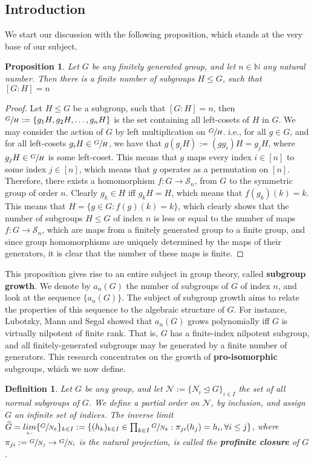\documentclass[12pt]{article}
\newtheorem{proposition}[theorem]{Proposition}
\newtheorem{definition}[theorem]{Definition}
\begin{document}
\subsection{Introduction}
We start our discussion with the following proposition, which stands at the very base of our subject.
\begin{proposition} \label{prop:finite.number.subgroups}
Let $G$ be any finitely generated group, and let $n\in\mathbb{N}$ any natural number. Then there is a finite number of subgroups $H\leq G$, such that $[G:H]=n$
\end{proposition}
\begin{proof}
Let $H\leq G$ be a subgroup, such that $[G:H]=n$, then $\sfrac{G}{H}:=\{g_1H,g_2H,\dots,g_nH\}$ is the set containing all left-cosets of $H$ in $G$. We may consider the action of $G$ by left multiplication on $\sfrac{G}{H}$. i.e., for all $g\in G$, and for all left-cosets $g_iH\in\sfrac{G}{H}$, we have that $g(g_iH):=(gg_i)H=g_jH$, where $g_jH\in\sfrac{G}{H}$ is some left-coset. This means that $g$ maps every index $i\in[n]$ to some index $j\in[n]$, which means that $g$ operates as a permutation on $[n]$. Therefore, there exists a homomorphism $f:G\rightarrow\mathcal{S}_n$, from $G$ to the symmetric group of order $n$. 
Clearly $g_k\in H$ iff $g_kH=H$, which means that $f(g_k)(k)=k$.  This means that $H=\{g\in G : f(g)(k)=k\}$, which clearly shows that the number of subgroups $H\leq G$ of index $n$ is less or equal to the number of maps $f : G
\rightarrow\mathcal{S}_n$, which are maps from a finitely generated group to a finite group, and since group homomorphisms are uniquely determined by the maps of their generators, it is clear that the number of these maps is finite.
\end{proof}
This proposition gives rise to an entire subject in group theory, called \textbf{subgroup growth}. We denote by $a_n(G)$ the number of subgroups of $G$ of index $n$, and look at the sequence $\{a_n(G)\}$. The subject of subgroup growth aims to relate the properties of this sequence to the algebraic structure of $G$. For instance, Lubotzky, Mann and Segal showed that $a_n(G)$ grows polynomially iff $G$ is virtually nilpotent of finite rank. That is, $G$ has a finite-index nilpotent subgroup, and all finitely-generated subgroups may be generated by a finite number of generators. This research concentrates on the growth of \textbf{pro-isomorphic} subgroups, which we now define.
\begin{definition}
\label{def:profinite.closure}
Let $G$ be any group, and let $\mathcal{N}:=\{N_i\trianglelefteq G\}_{i\in I}$ the set of all normal subgroups of $G$. We define a partial order on $\mathcal{N}$, by inclusion, and assign $G$ an infinite set of indices. The inverse limit $\widehat{G}=\underset{\leftarrow}{lim}\{\sfrac{G}{N_k}\}_{k\in I}:=\{(h_k)_{k\in I}\in\prod_{k\in I}\sfrac{G}{N_k} : \pi_{ji}(h_j)=h_i,\forall i\leq j\}$, where $\pi_{ji}:=\sfrac{G}{N_j}\rightarrow\sfrac{G}{N_i}$ is the natural projection, is called the \textbf{profinite closure} of $G$.
\end{definition}
\end{document}
